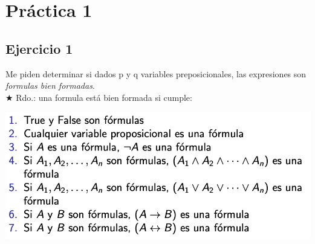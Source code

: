 
\usepackage{caratula}
\usepackage{enumerate}
\usepackage{hyperref}
\usepackage{graphicx}
\usepackage{amsfonts}
\usepackage{enumitem}

\decimalpoint
\hypersetup{colorlinks=true, linkcolor=black, urlcolor=blue}
\setlength{\parindent}{0em}
\setlength{\parskip}{0.5em}
\setcounter{tocdepth}{2} %
\setcounter{section}{0} %
\renewcommand{\thesubsubsection}{\thesubsection.\Alph{subsubsection}}
\graphicspath{ {images/} }



	
	
	\maketitle
	\newpage
	
	\tableofcontents
	\newpage
	
	\section{Práctica 1}
	
	\subsection{Ejercicio 1}
	
	Me piden determinar si dados p y q variables preposicionales, las expresiones son \emph{formulas bien formadas}.\\
	$\bigstar$ Rdo.: una formula está bien formada si cumple: 
	
	\includegraphics[width=\textwidth]{FBF}
	
